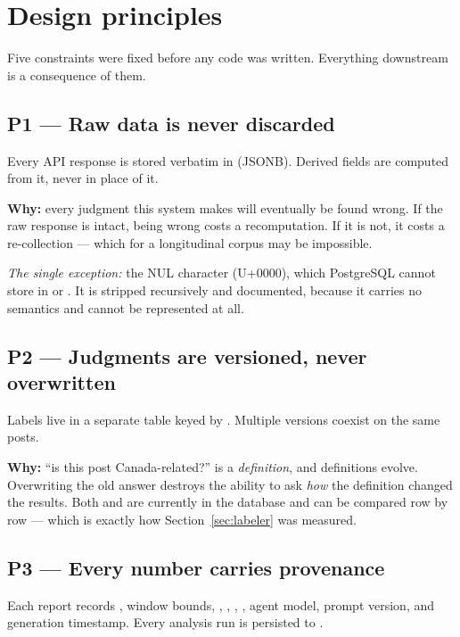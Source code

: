 \documentclass[11pt]{article}
\begin{document}
\section{Design principles}

Five constraints were fixed before any code was written. Everything downstream
is a consequence of them.

\subsection*{P1 --- Raw data is never discarded}
Every API response is stored verbatim in  (JSONB). Derived
fields are computed from it, never in place of it.

\textbf{Why:} every judgment this system makes will eventually be found wrong.
If the raw response is intact, being wrong costs a recomputation. If it is not,
it costs a re-collection --- which for a longitudinal corpus may be impossible.

\emph{The single exception:} the NUL character (U+0000), which PostgreSQL cannot
store in  or . It is stripped recursively and documented,
because it carries no semantics and cannot be represented at all.

\subsection*{P2 --- Judgments are versioned, never overwritten}
Labels live in a separate  table keyed by
. Multiple versions coexist on the same posts.

\textbf{Why:} ``is this post Canada-related?'' is a \emph{definition}, and
definitions evolve. Overwriting the old answer destroys the ability to ask
\emph{how} the definition changed the results. Both  and
 are currently in the database and can be compared row by row
--- which is exactly how Section~\ref{sec:labeler} was measured.

\subsection*{P3 --- Every number carries provenance}
Each report records , window bounds, ,
, , , agent model,
prompt version, and generation timestamp. Every analysis run is persisted to
.
\end{document}

